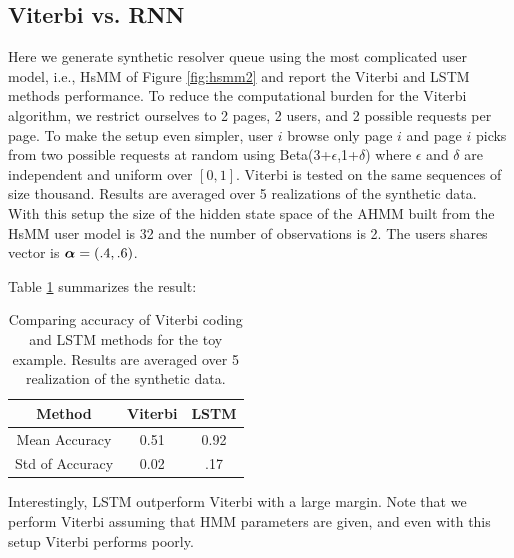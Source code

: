 	\subsection{Viterbi vs. RNN}
	\label{subsec:viterbi}
	Here we generate synthetic resolver queue using the most complicated user model, i.e., HsMM of Figure \ref{fig:hsmm2} and report the Viterbi and LSTM methods performance. 
	To reduce the computational burden for the Viterbi algorithm, we restrict ourselves to 2 pages, 2 users, and 2 possible requests per page. 
	To make the setup even simpler, user $i$ browse only page $i$ and page $i$ picks from two possible requests at random using Beta(3+$\epsilon$,1+$\delta$) where $\epsilon$ and $\delta$ are independent and uniform over $[0,1]$.
	Viterbi is tested on the same sequences of size thousand. 
	Results are averaged over 5 realizations of the synthetic data. 
	With this setup the size of the hidden state space of the AHMM built from the HsMM user model is 32 and the number of observations is 2. 
	The users shares vector is $\boldsymbol{\alpha} = (.4, .6)$.
	
	Table \ref{tab:viterbi} summarizes the result:
	\begin{table}
		\scriptsize  
		\centering
		\begin{tabular}{|c|c|c|}
			\hline
			{\bf Method} & {\bf Viterbi} & {\bf LSTM} \\ 
			\hline  			
			Mean Accuracy	& 0.51	&  0.92  \\ \hline 
			Std of Accuracy	& 0.02		&  .17  \\ \hline 
		\end{tabular}
		\caption{Comparing accuracy of Viterbi coding and LSTM methods for the toy example. Results are averaged over 5 realization of the synthetic data.}
		\label{tab:viterbi}
	\end{table}
	Interestingly, LSTM outperform Viterbi with a large margin. 
	Note that we perform Viterbi assuming that HMM parameters are given, and even with this setup Viterbi performs poorly. 
	
